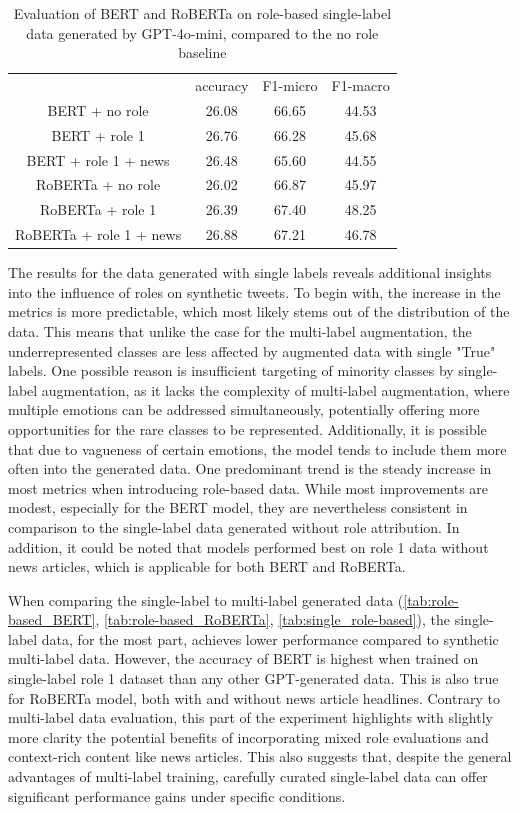 \documentclass[manuscript]{clv3}
\begin{document}
\begin{table}
    \centering
    \begin{tabular}{cccc}
         &  accuracy&  F1-micro& F1-macro\\
 BERT + no role& 26.08& 66.65&44.53\\
         BERT + role 1&  26.76&  66.28& 45.68\\
         BERT + role 1 + news&  26.48&  65.60& 44.55\\
 RoBERTa + no role& 26.02& 66.87&45.97\\
         RoBERTa + role 1&  26.39&  67.40& 48.25\\
         RoBERTa + role 1 + news&  26.88&  67.21& 46.78\\
    \end{tabular}
    \caption{Evaluation of BERT and RoBERTa on role-based single-label data generated by GPT-4o-mini, compared to the no role baseline}
    \label{tab:single_role-based}
\end{table}

The results for the data generated with single labels reveals additional insights into the influence of roles on synthetic tweets. To begin with, the increase in the metrics is more predictable, which most likely stems out of the distribution of the data. This means that unlike the case for the multi-label augmentation, the underrepresented classes are less affected by augmented data with single "True" labels. One possible reason is insufficient targeting of minority classes by single-label augmentation, as it lacks the complexity of multi-label augmentation, where multiple emotions can be addressed simultaneously, potentially offering more opportunities for the rare classes to be represented. Additionally, it is possible that due to vagueness of certain emotions, the model tends to include them more often into the generated data. One predominant trend is the steady increase in most metrics when introducing role-based data. While most improvements are modest, especially for the BERT model, they are nevertheless consistent in comparison to the single-label data generated without role attribution. In addition, it could be noted that models performed best on role 1 data without news articles, which is applicable for both BERT and RoBERTa.

When comparing the single-label to multi-label generated data (\autoref{tab:role-based_BERT}, \autoref{tab:role-based_RoBERTa}, \autoref{tab:single_role-based}), the single-label data, for the most part, achieves lower performance compared to synthetic multi-label data. However, the accuracy of BERT is highest when trained on single-label role 1 dataset than any other GPT-generated data. This is also true for RoBERTa model, both with and without news article headlines. Contrary to multi-label data evaluation, this part of the experiment highlights with slightly more clarity the potential benefits of incorporating mixed role evaluations and context-rich content like news articles. This also suggests that, despite the general advantages of multi-label training, carefully curated single-label data can offer significant performance gains under specific conditions. 
\end{document}
